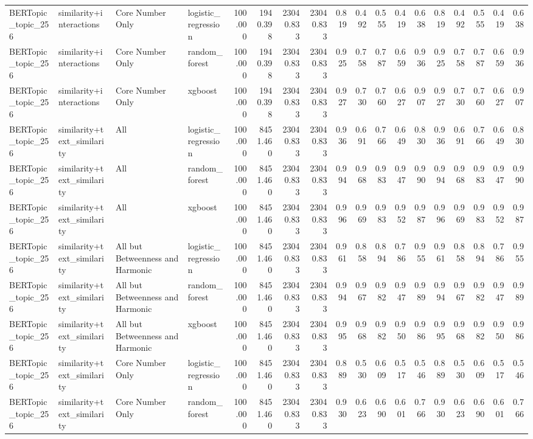 \begin{tabular}{llllrrrrrrrrrrrrrr}
BERTopic\_topic\_256 & similarity+interactions & Core Number Only & logistic\_regression & 100.000 & 1940.398 & 23040.833 & 23040.833 & 0.819 & 0.492 & 0.555 & 0.419 & 0.638 & 0.819 & 0.492 & 0.555 & 0.419 & 0.638 \\
BERTopic\_topic\_256 & similarity+interactions & Core Number Only & random\_forest & 100.000 & 1940.398 & 23040.833 & 23040.833 & 0.925 & 0.758 & 0.787 & 0.659 & 0.936 & 0.925 & 0.758 & 0.787 & 0.659 & 0.936 \\
BERTopic\_topic\_256 & similarity+interactions & Core Number Only & xgboost & 100.000 & 1940.398 & 23040.833 & 23040.833 & 0.927 & 0.730 & 0.760 & 0.627 & 0.907 & 0.927 & 0.730 & 0.760 & 0.627 & 0.907 \\
BERTopic\_topic\_256 & similarity+text\_similarity & All & logistic\_regression & 100.000 & 8451.460 & 23040.833 & 23040.833 & 0.936 & 0.691 & 0.766 & 0.649 & 0.830 & 0.936 & 0.691 & 0.766 & 0.649 & 0.830 \\
BERTopic\_topic\_256 & similarity+text\_similarity & All & random\_forest & 100.000 & 8451.460 & 23040.833 & 23040.833 & 0.994 & 0.968 & 0.983 & 0.947 & 0.990 & 0.994 & 0.968 & 0.983 & 0.947 & 0.990 \\
BERTopic\_topic\_256 & similarity+text\_similarity & All & xgboost & 100.000 & 8451.460 & 23040.833 & 23040.833 & 0.996 & 0.969 & 0.983 & 0.952 & 0.987 & 0.996 & 0.969 & 0.983 & 0.952 & 0.987 \\
BERTopic\_topic\_256 & similarity+text\_similarity & All but Betweenness and Harmonic & logistic\_regression & 100.000 & 8451.460 & 23040.833 & 23040.833 & 0.961 & 0.858 & 0.894 & 0.786 & 0.955 & 0.961 & 0.858 & 0.894 & 0.786 & 0.955 \\
BERTopic\_topic\_256 & similarity+text\_similarity & All but Betweenness and Harmonic & random\_forest & 100.000 & 8451.460 & 23040.833 & 23040.833 & 0.994 & 0.967 & 0.982 & 0.947 & 0.989 & 0.994 & 0.967 & 0.982 & 0.947 & 0.989 \\
BERTopic\_topic\_256 & similarity+text\_similarity & All but Betweenness and Harmonic & xgboost & 100.000 & 8451.460 & 23040.833 & 23040.833 & 0.995 & 0.968 & 0.982 & 0.950 & 0.986 & 0.995 & 0.968 & 0.982 & 0.950 & 0.986 \\
BERTopic\_topic\_256 & similarity+text\_similarity & Core Number Only & logistic\_regression & 100.000 & 8451.460 & 23040.833 & 23040.833 & 0.889 & 0.530 & 0.609 & 0.517 & 0.546 & 0.889 & 0.530 & 0.609 & 0.517 & 0.546 \\
BERTopic\_topic\_256 & similarity+text\_similarity & Core Number Only & random\_forest & 100.000 & 8451.460 & 23040.833 & 23040.833 & 0.930 & 0.623 & 0.690 & 0.601 & 0.766 & 0.930 & 0.623 & 0.690 & 0.601 & 0.766 \\

\end{tabular}
